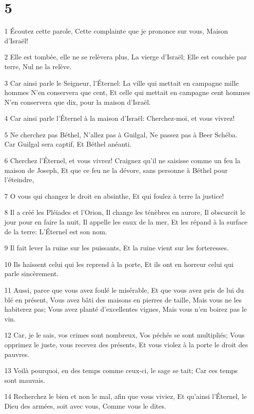 \chapter{5}

\par 1 Écoutez cette parole, Cette complainte que je prononce sur vous, Maison d'Israël!
\par 2 Elle est tombée, elle ne se relèvera plus, La vierge d'Israël; Elle est couchée par terre, Nul ne la relève.
\par 3 Car ainsi parle le Seigneur, l'Éternel: La ville qui mettait en campagne mille hommes N'en conservera que cent, Et celle qui mettait en campagne cent hommes N'en conservera que dix, pour la maison d'Israël.
\par 4 Car ainsi parle l'Éternel à la maison d'Israël: Cherchez-moi, et vous vivrez!
\par 5 Ne cherchez pas Béthel, N'allez pas à Guilgal, Ne passez pas à Beer Schéba. Car Guilgal sera captif, Et Béthel anéanti.
\par 6 Cherchez l'Éternel, et vous vivrez! Craignez qu'il ne saisisse comme un feu la maison de Joseph, Et que ce feu ne la dévore, sans personne à Béthel pour l'éteindre,
\par 7 O vous qui changez le droit en absinthe, Et qui foulez à terre la justice!
\par 8 Il a créé les Pléiades et l'Orion, Il change les ténèbres en aurore, Il obscurcit le jour pour en faire la nuit, Il appelle les eaux de la mer, Et les répand à la surface de la terre: L'Éternel est son nom.
\par 9 Il fait lever la ruine sur les puissants, Et la ruine vient sur les forteresses.
\par 10 Ils haïssent celui qui les reprend à la porte, Et ils ont en horreur celui qui parle sincèrement.
\par 11 Aussi, parce que vous avez foulé le misérable, Et que vous avez pris de lui du blé en présent, Vous avez bâti des maisons en pierres de taille, Mais vous ne les habiterez pas; Vous avez planté d'excellentes vignes, Mais vous n'en boirez pas le vin.
\par 12 Car, je le sais, vos crimes sont nombreux, Vos péchés se sont multipliés; Vous opprimez le juste, vous recevez des présents, Et vous violez à la porte le droit des pauvres.
\par 13 Voilà pourquoi, en des temps comme ceux-ci, le sage se tait; Car ces temps sont mauvais.
\par 14 Recherchez le bien et non le mal, afin que vous viviez, Et qu'ainsi l'Éternel, le Dieu des armées, soit avec vous, Comme vous le dites.
